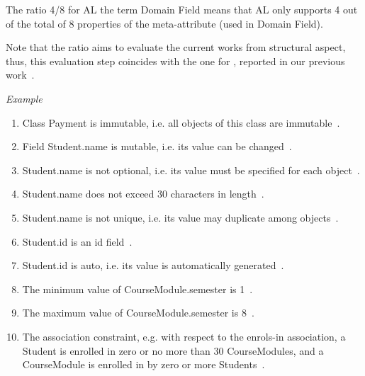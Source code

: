 The ratio 4/8 for AL \wrt the term Domain Field means that AL only supports 4 out of the total of 8 properties of the meta-attribute  (used in Domain Field). 

Note that the ratio aims to evaluate the current works from structural aspect, thus, this evaluation step coincides with the one for \dcsl, reported in our previous work~\cite{le_domain_2018}. %

\textit{Example}
\begin{enumerate}
	\item Class Payment is immutable, i.e. all objects of this class are immutable~.
\item Field Student.name is mutable, i.e. its value can be changed~.
\item Student.name is not optional, i.e. its value must be specified for each object~.
\item Student.name does not exceed 30 characters in length~.
\item Student.name is not unique, i.e. its value may duplicate among objects~.
\item Student.id is an id field~.
\item Student.id is auto, i.e. its value is automatically generated~.
\item The minimum value of CourseModule.semester is 1~.
	\item The maximum value of CourseModule.semester is 8~.
	\item The association constraint, e.g. with respect to the enrols-in association, a Student is enrolled in zero or no more than 30 CourseModules,
	and a CourseModule is enrolled in by zero or more Students~.
\end{enumerate}